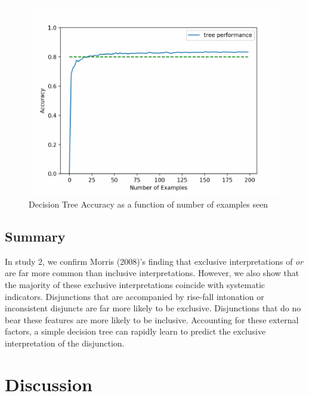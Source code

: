 \documentclass[10pt, letterpaper]{article}
\newenvironment{CodeChunk}{}{}
\begin{document}
\begin{CodeChunk}
\begin{figure}[H]

{\centering \includegraphics{figs/learningCurve-1} 

}

\caption[Decision Tree Accuracy as a function of number of examples seen]{Decision Tree Accuracy as a function of number of examples seen}\label{fig:learningCurve}
\end{figure}
\end{CodeChunk}

\subsection{Summary}\label{summary-1}

In study 2, we confirm Morris (2008)'s finding that exclusive
interpretations of \emph{or} are far more common than inclusive
interpretations. However, we also show that the majority of these
exclusive interpretations coincide with systematic indicators.
Disjunctions that are accompanied by rise-fall intonation or
inconsistent disjuncts are far more likely to be exclusive. Disjunctions
that do no bear these features are more likely to be inclusive.
Accounting for these external factors, a simple decision tree can
rapidly learn to predict the exclusive interpretation of the
disjunction.

\section{Discussion}\label{discussion}
\end{document}

